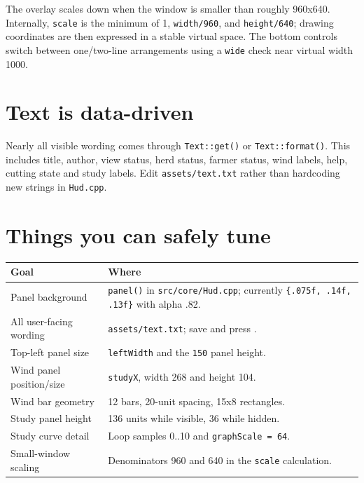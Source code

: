 \documentclass[11pt,a4paper,openany]{book}
\newcommand{\code}[1]{\texttt{#1}}
\newcommand{\file}[1]{\nolinkurl{#1}}
\newcommand{\keycap}[1]{\begingroup\setlength{\fboxsep}{0.8pt}\raisebox{0.05ex}{\fbox{\footnotesize\texttt{#1}}}\endgroup}
\newcommand{\rgb}[3]{\code{\{#1, #2, #3\}}}
\begin{document}
The overlay scales down when the window is smaller than roughly 960x640. Internally, \code{scale} is the minimum of 1, \code{width/960}, and \code{height/640}; drawing coordinates are then expressed in a stable virtual space. The bottom controls switch between one/two-line arrangements using a \code{wide} check near virtual width 1000.

\section{Text is data-driven}
Nearly all visible wording comes through \code{Text::get()} or \code{Text::format()}. This includes title, author, view status, herd status, farmer status, wind labels, help, cutting state and study labels. Edit \file{assets/text.txt} rather than hardcoding new strings in \file{Hud.cpp}.

\section{Things you can safely tune}
\begin{longtable}{@{}p{}p{}@{}}
	\toprule
	Goal                     & Where                                                                                        \\
	\midrule
	\endhead
	Panel background         & \code{panel()} in \file{src/core/Hud.cpp}; currently \rgb{.075f}{.14f}{.13f} with alpha .82. \\
	All user-facing wording  & \file{assets/text.txt}; save and press \keycap{F9}.                                          \\
	Top-left panel size      & \code{leftWidth} and the \code{150} panel height.                                            \\
	Wind panel position/size & \code{studyX}, width 268 and height 104.                                                     \\
	Wind bar geometry        & 12 bars, 20-unit spacing, 15x8 rectangles.                                                   \\
	Study panel height       & 136 units while visible, 36 while hidden.                                                    \\
	Study curve detail       & Loop samples 0..10 and \code{graphScale = 64}.                                               \\
	Small-window scaling     & Denominators 960 and 640 in the \code{scale} calculation.                                    \\
	\bottomrule
\end{longtable}
\end{document}
